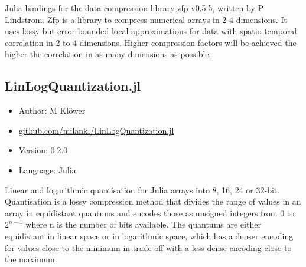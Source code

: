 Julia bindings for the data compression library \href{https://github.com/LLNL/zfp}{zfp} v0.5.5, written by P Lindstrom. Zfp is a library to compress numerical arrays in
2-4 dimensions. It uses lossy but error-bounded local approximations for data with spatio-temporal correlation in 2 to 4 dimensions. Higher compression factors
will be achieved the higher the correlation in as many dimensions as possible.

\subsection{LinLogQuantization.jl}

\begin{itemize}
    \setlength\itemsep{-5pt}
    \item Author: M Klöwer
    \item \href{https://github.com/milankl/LinLogQuantization.jl}{github.com/milankl/LinLogQuantization.jl}
    \item Version: 0.2.0
    \item Language: Julia
\end{itemize}

Linear and logarithmic quantisation for Julia arrays into 8, 16, 24 or 32-bit. Quantisation is a lossy compression method that divides the range of values in an array
in equidistant quantums and encodes those as unsigned integers from $0$ to $2^{n-1}$ where n is the number of bits available. The quantums are either equidistant
in linear space or in logarithmic space, which has a denser encoding for values close to the minimum in trade-off with a less dense encoding close to the maximum.
